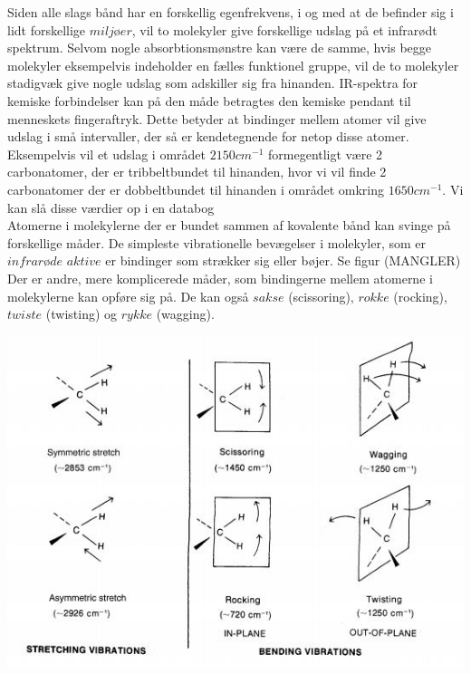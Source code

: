 Siden alle slags bånd har en forskellig egenfrekvens, i og med at de befinder sig i lidt forskellige $miljøer$, vil to molekyler give forskellige udslag på et infrarødt spektrum. Selvom nogle absorbtionsmønstre kan være de samme, hvis begge molekyler eksempelvis indeholder en fælles funktionel gruppe, vil de to molekyler stadigvæk give nogle udslag som adskiller sig fra hinanden. IR-spektra for kemiske forbindelser kan på den måde betragtes den kemiske pendant til menneskets fingeraftryk. Dette betyder at bindinger mellem atomer vil give udslag i små intervaller, der så er kendetegnende for netop disse atomer. Eksempelvis vil et udslag i området $2150cm^{-1}$ formegentligt være 2 carbonatomer, der er tribbeltbundet til hinanden, hvor vi vil finde 2 carbonatomer der er dobbeltbundet til hinanden i området omkring $1650cm^{-1}$. Vi kan slå disse værdier op i en databog
\\

Atomerne i molekylerne der er bundet sammen af kovalente bånd kan svinge på forskellige måder. De simpleste vibrationelle bevægelser i molekyler, som er $infrarøde$ $aktive$ er bindinger som strækker sig eller bøjer. Se figur (MANGLER)
\\

Der er andre, mere komplicerede måder, som bindingerne mellem atomerne i molekylerne kan opføre sig på. De kan også $sakse$ (scissoring), $rokke$ (rocking), $twiste$ (twisting) og $rykke$ (wagging). 
\\

\begin{center}
\includegraphics[scale=1]{Billeder/streak}
\end{center}
 

